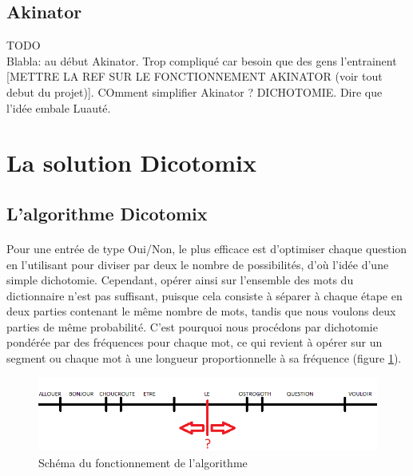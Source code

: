 \documentclass[11pt,a4paper]{article}
\theoremstyle{plain}
\theoremstyle{definition}
\begin{document}
\subsection{Akinator}

TODO\\

Blabla: au début Akinator. Trop compliqué car besoin que des gens l'entrainent [METTRE LA REF SUR LE FONCTIONNEMENT AKINATOR (voir tout debut du projet)]. 
COmment simplifier Akinator ? DICHOTOMIE. Dire que l'idée embale Luauté.


\section{La solution Dicotomix}
 
\subsection{L'algorithme Dicotomix}
\paragraph{} Pour une entrée de type Oui/Non, le plus efficace est d'optimiser chaque question en l'utilisant pour diviser par deux le nombre de possibilités,  d'où l'idée d'une simple dichotomie.
Cependant, opérer ainsi sur l'ensemble des mots du dictionnaire n'est pas suffisant, puisque cela consiste à séparer à chaque étape en deux parties contenant le même nombre de mots, tandis que nous voulons deux parties de même probabilité. 
C'est pourquoi nous procédons par dichotomie pondérée par des fréquences pour chaque mot, ce qui revient à opérer sur un segment ou chaque mot à une longueur proportionnelle à sa fréquence (figure \ref{algo}).

\begin{figure}[h!]
\centering
\includegraphics[scale=0.6]{schema_algo.png}
\caption{Schéma du fonctionnement de l'algorithme}
\label{algo}
\end{figure}
\end{document}
